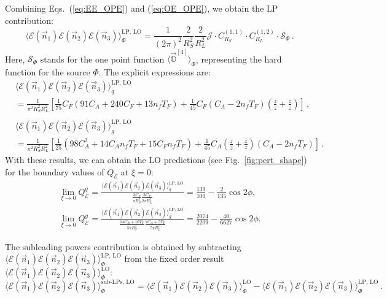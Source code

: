 \documentclass[letterpaper,11pt]{article}
\def\beq{\begin{equation}}
\def\eeq{\end{equation}}
\def\Fig#1{Fig.~{\ref{#1}}}
\def\to{\rightarrow}
\DeclareRobustCommand{\Fig}[1]{Fig.~\ref{#1}}
\DeclareRobustCommand{\Eqs}[2]{Eqs.~(\ref{#1}) and (\ref{#2})}
\begin{document}
Combining \Eqs{eq:EE_OPE}{eq:OE_OPE}, we obtain the LP contribution:
\beq
\langle\mathcal{E}(\vec{n}_1)\mathcal{E}(\vec{n}_2)\mathcal{E}(\vec{n}_3)\rangle_\Phi^{\mathrm{LP,\, LO}}
=\frac{1}{(2\pi)^2} \frac{2}{R_S^2}\frac{2}{R_L^2} {\mathcal{J}}\cdot {C}_{R_S}^{(1,1)}
\cdot {C}_{R_L}^{(1,2)}
\cdot \mathcal{S}_\Phi\,.
\eeq
Here, $\mathcal{S}_\Phi$ stands for the one point function $\langle \vec{\mathbb{O}}^{[4]} \rangle_\Phi$, representing the hard function for the source $\Phi$.
%
The explicit expressions are:
\begin{align}
&\langle\mathcal{E}(\vec{n}_1)\mathcal{E}(\vec{n}_2)\mathcal{E}(\vec{n}_3)\rangle_q^{\mathrm{LP,\, LO}} \\
&= \frac{1}{\pi^2 R_S^2 R_L^2}\left[\frac{1}{75} C_F(91 C_A+240 C_F+13 n_f T_F) + \frac{1}{45} C_F  (C_A-2 n_f T_F)\left(\frac{z}{\bar{z}}+\frac{\bar{z}}{z}\right) \right]\,,\nonumber\\
\nonumber\\
&\langle\mathcal{E}(\vec{n}_1)\mathcal{E}(\vec{n}_2)\mathcal{E}(\vec{n}_3)\rangle_g^{\mathrm{LP,\, LO}} \\
&= \frac{1}{\pi^2 R_S^2 R_L^2}\left[\frac{1}{25} \left(98 C_A^2+14 C_A n_f T_F+15 C_F n_f T_F\right)+\frac{1}{45} C_A \left(\frac{z}{\bar{z}}+\frac{\bar{z}}{z}\right) (C_A-2 n_f T_F)\right]\,.\nonumber
\end{align}
%
With these results, we can obtain the LO predictions (see \Fig{fig:pert_shape}) for the boundary values of $Q_{\mathcal{E}}$ at $\xi=0$:
\begin{eqnarray}
\lim_{\xi\to0} Q_{\mathcal{E}}^q = \frac{\langle \mathcal{E}(\vec{n}_1)\mathcal{E}(\vec{n}_2)\mathcal{E}(\vec{n}_3) \rangle_q^{\mathrm{LP,\,LO}}}{\frac{3C_F}{\pi R_S^2}\frac{3C_F}{2\pi R_L^2}}= \frac{139}{100}-\frac{2}{135}\cos 2\phi,\\
\lim_{\xi\to0} Q_{\mathcal{E}}^g = \frac{\langle \mathcal{E}(\vec{n}_1)\mathcal{E}(\vec{n}_2)\mathcal{E}(\vec{n}_3) \rangle_g^{\mathrm{LP,\,LO}}}{\frac{14C_A+10T_F}{5\pi R_S^2}\frac{7C_A +5 T_F}{5\pi R_L^2}}= \frac{2074}{2209}-\frac{40}{6627}\cos 2\phi.
\end{eqnarray}
%


The subleading powers contribution is obtained by subtracting $\langle\mathcal{E}(\vec{n}_1)\mathcal{E}(\vec{n}_2)\mathcal{E}(\vec{n}_3)\rangle_\Phi^{\mathrm{LP,\, LO}}$ from the fixed order result $\langle\mathcal{E}(\vec{n}_1)\mathcal{E}(\vec{n}_2)\mathcal{E}(\vec{n}_3)\rangle_\Phi^{\mathrm{LO}}$:
\beq
\langle\mathcal{E}(\vec{n}_1)\mathcal{E}(\vec{n}_2)\mathcal{E}(\vec{n}_3)\rangle_\Phi^{\mathrm{sub\text{-}LPs,\, LO}} 
=\langle\mathcal{E}(\vec{n}_1)\mathcal{E}(\vec{n}_2)\mathcal{E}(\vec{n}_3)\rangle_\Phi^{\mathrm{LO}}
 - \langle\mathcal{E}(\vec{n}_1)\mathcal{E}(\vec{n}_2)\mathcal{E}(\vec{n}_3)\rangle_\Phi^{\mathrm{LP,\, LO}}\,. 
\eeq
\end{document}
